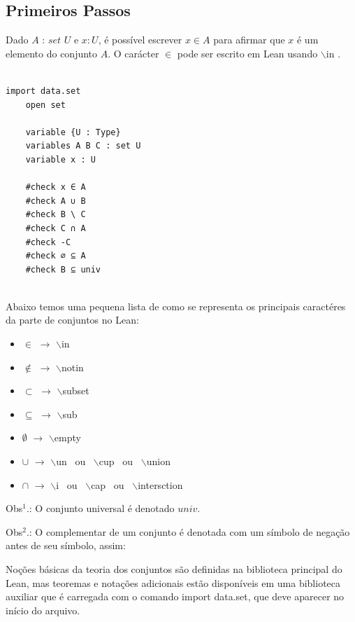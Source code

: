 \subsection{Primeiros Passos}
    Dado $A$ : $set$ $U$ e $x : U$, é possível escrever $x \in A$ para afirmar que $x$ é um elemento do conjunto $A$. O carácter $\in$ pode ser escrito em Lean usando $\backslash$in .
    

\begin{lstlisting}

import data.set
    open set

    variable {U : Type}
    variables A B C : set U
    variable x : U

    #check x ∈ A
    #check A ∪ B
    #check B \ C
    #check C ∩ A
    #check -C
    #check ∅ ⊆ A
    #check B ⊆ univ
    
 \end{lstlisting}


Abaixo temos uma pequena lista de como se representa os principais caractéres da parte de conjuntos no Lean: 

\begin{itemize}
    \item $\in$ $\rightarrow$ $\backslash$in
    \item $\notin$ $\rightarrow$ $\backslash$notin
    \item $\subset$ $\rightarrow$ $\backslash$subset
    \item $\subseteq$ $\rightarrow$ $\backslash$sub
    \item $\emptyset$ $\rightarrow$ $\backslash$empty
    \item $\cup$ $\rightarrow$ $\backslash$un \ ou \ $\backslash$cup \ ou \ $\backslash$union
    \item $\cap$ $\rightarrow$ $\backslash$i \ ou \ $\backslash$cap \ ou \ $\backslash$intersction
\end{itemize}
Obs$^{1}$.: O conjunto universal é denotado $univ$.

Obs$^{2}$.: O complementar de um conjunto é denotada com um símbolo de negação antes de seu símbolo, assim: 

Noções básicas da teoria dos conjuntos são definidas na biblioteca principal do Lean, mas teoremas e notações adicionais estão disponíveis em uma biblioteca auxiliar que é carregada com o comando import data.set, que deve aparecer no início do arquivo.

